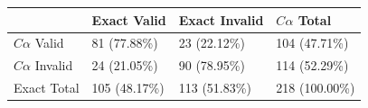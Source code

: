 \begin{tabular}{llll}
\toprule
 & Exact Valid & Exact Invalid & $C\alpha$ Total \\
\midrule
$C\alpha$ Valid & 81 (77.88\%) & 23 (22.12\%) & 104 (47.71\%) \\
$C\alpha$ Invalid & 24 (21.05\%) & 90 (78.95\%) & 114 (52.29\%) \\
Exact Total & 105 (48.17\%) & 113 (51.83\%) & 218 (100.00\%) \\
\bottomrule
\end{tabular}

